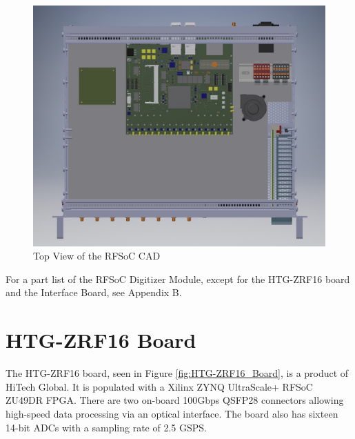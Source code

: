 \documentclass[12pt,a4paper,oneside]{article}
\begin{document}
%
\begin{figure}[H]
\centering
\includegraphics[width=.9\linewidth]{figures/CAD_top.jpeg}
\caption{Top View of the RFSoC CAD}
\label{fig:CAD-top}
\end{figure}
%

For a part list of the RFSoC Digitizer Module, except for the HTG-ZRF16 board and the  Interface Board,  see Appendix B. 


\section{HTG-ZRF16 Board}
\label{sec:3}

The HTG-ZRF16 board, seen in Figure \ref{fig:HTG-ZRF16_Board}, is a product of HiTech Global. It is populated with a Xilinx ZYNQ UltraScale+ RFSoC ZU49DR FPGA. There are two on-board 100Gbps QSFP28 connectors allowing high-speed data processing via an optical interface. The board also has sixteen 14-bit ADCs with a sampling rate of 2.5 GSPS. 
\end{document}
